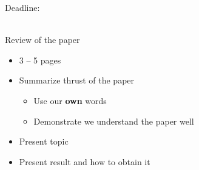 \documentclass{article}
\title{}
\author{
    Wuyue Sun\\
    \normalsize{\href{mailto:wuyue.sun@epfl.ch}{\texttt{wuyue.sun@epfl.ch}}}
    \and
    Boran Xu\\
    \normalsize{\href{mailto:boran.xu@epfl.ch}{\texttt{boran.xu@epfl.ch}}}
    \and
    Yue Yu\\
    \normalsize{\href{mailto:yue.yu@epfl.ch}{\texttt{yue.yu@epfl.ch}}}
}
\date{}
\begin{document}
\maketitle

Deadline: \date{7.11.2024} \\

Review of the paper
\begin{itemize}
    \item 3 -- 5 pages
    \item Summarize thrust of the paper
    \begin{itemize}
        \item Use our \textbf{own} words
        \item Demonstrate we understand the paper well
    \end{itemize}
    \item Present topic
    \item Present result and how to obtain it
\end{itemize}
\end{document}
